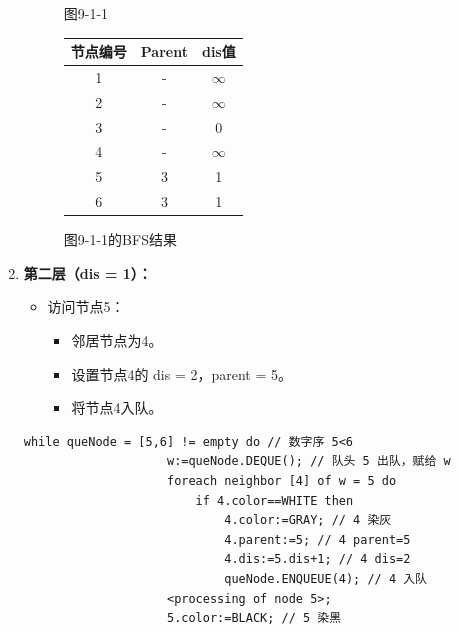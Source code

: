 \documentclass{article}
\begin{document}
\begin{enumerate}
\begin{figure}[htbp]
\begin{minipage}[b]{0.6\textwidth}
            \caption{图9-1-1}
            \label{fig:9-1-1}
        \end{minipage}%
        \hfill%
        \begin{minipage}[b]{0.4\textwidth}    %
            \centering
            \begin{tabular}{|c|c|c|}
                \hline
                节点编号 & Parent & dis值 \\
                \hline
                1 & - & $\infty$ \\
                2 & - & $\infty$ \\
                3 & - & 0 \\
                4 & - & $\infty$ \\
                5 & 3 & 1 \\
                6 & 3 & 1 \\
                \hline
            \end{tabular}
            \caption{图9-1-1的BFS结果}
            \label{tab:graph9-1-1-bfs}
        \end{minipage}
    \end{figure}
    
    \pagebreak

    \item \textbf{第二层（dis = 1）：}

    \begin{itemize}
        \item 访问节点5：
        \begin{itemize}
            \item 邻居节点为4。
            \item 设置节点4的 dis = 2，parent = 5。
            \item 将节点4入队。
        \end{itemize}
    \end{itemize}

    \begin{lstlisting}[style=algorithmPPT]
                while queNode = [5,6] != empty do // 数字序 5<6
                    w:=queNode.DEQUE(); // 队头 5 出队，赋给 w
                    foreach neighbor [4] of w = 5 do
                        if 4.color==WHITE then
                            4.color:=GRAY; // 4 染灰
                            4.parent:=5; // 4 parent=5
                            4.dis:=5.dis+1; // 4 dis=2
                            queNode.ENQUEUE(4); // 4 入队
                    <processing of node 5>;
                    5.color:=BLACK; // 5 染黑
                \end{lstlisting}    


\end{enumerate}
\end{document}
